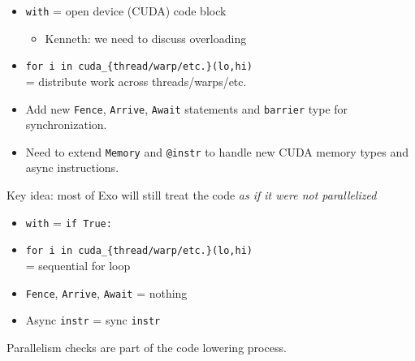 \begin{minipage}[t]{0.5\textwidth}\fixminipage
{}
\begin{itemize}
  \item \texttt{with} = open device (CUDA) code block
  \begin{itemize}
    \item Kenneth: we need to discuss overloading
  \end{itemize}
  \item \texttt{for i in cuda\_\{thread/warp/etc.\}(lo,hi)}\\ = distribute work across threads/warps/etc.
  \item Add new \texttt{Fence}, \texttt{Arrive}, \texttt{Await} statements and \texttt{barrier} type for synchronization.
  \item Need to extend \texttt{Memory} and \texttt{@instr} to handle new CUDA memory types and async instructions.
\end{itemize}


Key idea: most of Exo will still treat the code \textit{as if it were not parallelized}

\begin{itemize}
  \item \texttt{with} = \texttt{if True:}
  \item \texttt{for i in cuda\_\{thread/warp/etc.\}(lo,hi)}\\ = sequential for loop
  \item \texttt{Fence}, \texttt{Arrive}, \texttt{Await} = nothing
  \item Async \texttt{instr} = sync \texttt{instr}
\end{itemize}

Parallelism checks are part of the code lowering process.

\end{minipage} %
\newpage


